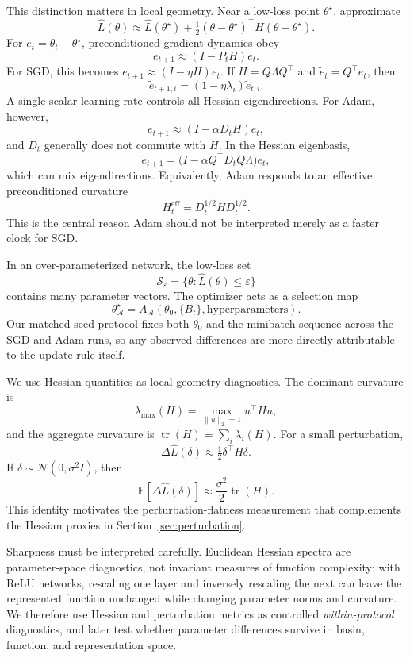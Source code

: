 \documentclass[11pt]{article}
\begin{document}
This distinction matters in local geometry. Near a low-loss point $\theta^\star$, approximate
\[
  \widehat L(\theta)\approx \widehat L(\theta^\star)+\tfrac12(\theta-\theta^\star)^\top H(\theta-\theta^\star).
\]
For $e_t=\theta_t-\theta^\star$, preconditioned gradient dynamics obey
\[
  e_{t+1}\approx (I-P_tH)e_t.
\]
For SGD, this becomes $e_{t+1}\approx (I-\eta H)e_t$. If $H=Q\Lambda Q^\top$ and $\tilde e_t=Q^\top e_t$, then
\[
  \tilde e_{t+1,i}=(1-\eta\lambda_i)\tilde e_{t,i}.
\]
A single scalar learning rate controls all Hessian eigendirections. For Adam, however,
\[
  e_{t+1}\approx (I-\alpha D_tH)e_t,
\]
and $D_t$ generally does not commute with $H$. In the Hessian eigenbasis,
\[
  \tilde e_{t+1}=\bigl(I-\alpha Q^\top D_tQ\Lambda\bigr)\tilde e_t,
\]
which can mix eigendirections. Equivalently, Adam responds to an effective preconditioned curvature
\[
  H_t^{\mathrm{eff}}=D_t^{1/2}HD_t^{1/2}.
\]
This is the central reason Adam should not be interpreted merely as a faster clock for SGD.

In an over-parameterized network, the low-loss set
\[
  \mathcal S_\varepsilon=\{\theta:\widehat L(\theta)\le \varepsilon\}
\]
contains many parameter vectors. The optimizer acts as a selection map
\[
  \theta^\star_{\mathcal A}=A_{\mathcal A}(\theta_0,\{B_t\},\text{hyperparameters}).
\]
Our matched-seed protocol fixes both $\theta_0$ and the minibatch sequence across the SGD and Adam runs, so any observed differences are more directly attributable to the update rule itself.

We use Hessian quantities as local geometry diagnostics. The dominant curvature is
\[
  \lambda_{\max}(H)=\max_{\|u\|_2=1}u^\top Hu,
\]
and the aggregate curvature is $\operatorname{tr}(H)=\sum_i\lambda_i(H)$. For a small perturbation,
\[
  \Delta\widehat L(\delta)\approx \tfrac12\delta^\top H\delta.
\]
If $\delta\sim\mathcal N(0,\sigma^2I)$, then
\[
  \mathbb E[\Delta\widehat L(\delta)]\approx \frac{\sigma^2}{2}\operatorname{tr}(H).
\]
This identity motivates the perturbation-flatness measurement that complements the Hessian proxies in Section~\ref{sec:perturbation}.

Sharpness must be interpreted carefully. Euclidean Hessian spectra are parameter-space diagnostics, not invariant measures of function complexity: with ReLU networks, rescaling one layer and inversely rescaling the next can leave the represented function unchanged while changing parameter norms and curvature. We therefore use Hessian and perturbation metrics as controlled \emph{within-protocol} diagnostics, and later test whether parameter differences survive in basin, function, and representation space.
\end{document}
